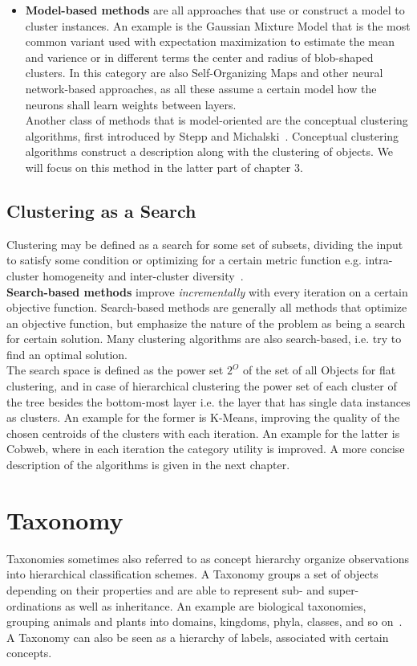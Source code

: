 \begin{itemize}
    \item \textbf{Model-based methods} are all approaches that use or construct a model to cluster instances. An example is the Gaussian Mixture Model that is the most common variant used with expectation maximization to estimate the mean and varience or in different terms the center and radius of blob-shaped clusters. In this category are also Self-Organizing Maps and other neural network-based approaches, as all these assume a certain model how the neurons shall learn weights between layers.  \\
    Another class of methods that is model-oriented are the conceptual clustering algorithms, first introduced by Stepp and Michalski~\cite{michalski1983learning}. Conceptual clustering algorithms construct a description along with the clustering of objects. We will focus on this method in the latter part of chapter 3.
\end{itemize}


\subsection{Clustering as a Search}\label{\positionnumber}
Clustering may be defined as a search for some set of subsets, dividing the input to satisfy some condition or optimizing for a certain metric function e.g. intra-cluster homogeneity and inter-cluster diversity~\cite{Fisher1987}. \\
\textbf{Search-based methods} improve \textit{incrementally} with every iteration on a certain objective function. Search-based methods are generally all methods that optimize an objective function, but emphasize the nature of the problem as being a search for certain solution. Many clustering algorithms are also search-based, i.e. try to find an optimal solution. \\
The search space is defined as the power set $2^O$ of the set of all Objects for flat clustering, and in case of hierarchical clustering the power set of each cluster of the tree besides the bottom-most layer i.e. the layer that has single data instances as clusters. An example for the former is K-Means, improving the quality of the chosen centroids of the clusters with each iteration. An example for the latter is Cobweb, where in each iteration the category utility is improved. A more concise description of the algorithms is given in the next chapter.

\section{Taxonomy}\label{\positionnumber}
Taxonomies sometimes also referred to as concept hierarchy organize observations into hierarchical classification schemes. A Taxonomy groups a set of objects depending on their properties and are able to represent sub- and super-ordinations as well as inheritance. An example are biological taxonomies, grouping animals and plants into domains, kingdoms, phyla, classes, and so on~\cite{Krcmar2015, han2011data}. A Taxonomy can also be seen as a hierarchy of labels, associated with certain concepts. \\

